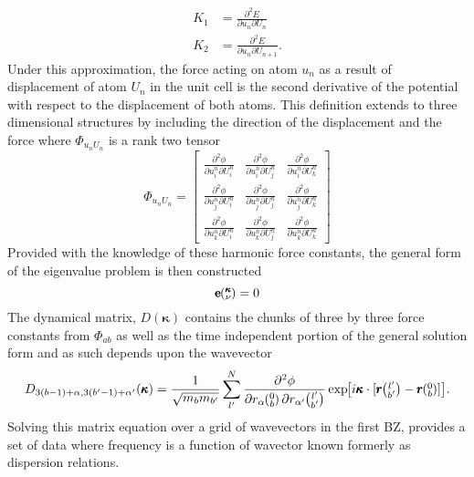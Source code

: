 %
\begin{equation}
\begin{split}
	K_1&=\frac{\partial^2 E}{\partial u_n\partial U_{n}}\\
	K_2&=\frac{\partial^2 E}{\partial u_n\partial U_{n+1}}.
\end{split}
\end{equation}
%
Under this approximation, the force acting on atom $u_n$ as a result of displacement of atom $U_n$ in the unit cell is the second derivative of the potential with respect to the displacement of both atoms. This definition extends to three dimensional structures by including the direction of the displacement and the force where $\Phi_{u_nU_n}$ is a rank two tensor
%
\begin{equation}
\Phi_{u_nU_n}=
\begin{bmatrix}
  \frac{\partial^2 \phi}{\partial u^n_i\partial U^n_i} & \frac{\partial^2 \phi}{\partial u^n_i\partial U^n_j} &\frac{\partial^2 \phi}{\partial u^n_i\partial U^n_k}\\
  \frac{\partial^2 \phi}{\partial u^n_j\partial U^n_i} & \frac{\partial^2 \phi}{\partial u^n_j\partial U^n_j} &\frac{\partial^2 \phi}{\partial u^n_j\partial U^n_k}\\
\frac{\partial^2 \phi}{\partial u^n_k\partial U^n_i} & \frac{\partial^2 \phi}{\partial u^n_k\partial U^n_j} &\frac{\partial^2 \phi}{\partial u^n_k\partial U^n_k}
 \end{bmatrix}
\end{equation}
Provided with the knowledge of these harmonic force constants, the general form of the eigenvalue problem is then constructed \cite{dove_introduction_1993-3}
\begin{equation}
[D(\pmb{\kappa})-I\omega^2\kv]\pmb{\mathrm{e}}\kv = 0
\end{equation}
%
The dynamical matrix, $D(\pmb{\kappa})$ contains the chunks of three by three force constants from $\Phi_{ab}$ as well as the time independent portion of the general solution form and as such depends upon the wavevector
\begin{equation}
D_{3(b-1)+\alpha,3(b'-1)+\alpha'}(\pmb{\kappa})=\frac{1}{\sqrt{m_bm_{b'}}}\sum_{l'}^N\frac{\partial^2\phi}{\partial r_\alpha \Ob \partial r_{\alpha'} \lbp} \EXP{i\pmb{\kappa}\cdot [\pmb{r}\lbp-\pmb{r}\Ob]}.
\end{equation}
Solving this matrix equation over a grid of wavevectors in the first BZ, provides a set of data where frequency is a function of wavector known formerly as dispersion relations.%

